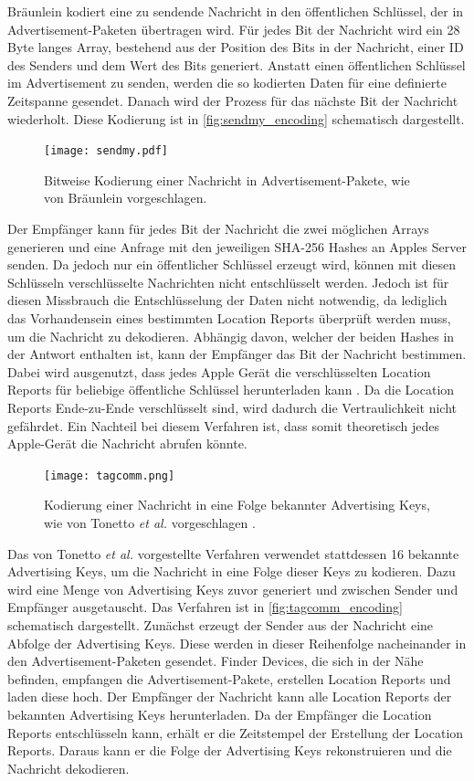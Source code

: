 Bräunlein \cite{braeunlein_sendmy} kodiert eine zu sendende Nachricht in den öffentlichen Schlüssel, der in Advertisement-Paketen übertragen wird.
Für jedes Bit der Nachricht wird ein 28 Byte langes Array, bestehend aus der Position des Bits in der Nachricht, einer ID des Senders und dem Wert des Bits generiert.
Anstatt einen öffentlichen Schlüssel im Advertisement zu senden, werden die so kodierten Daten für eine definierte Zeitspanne gesendet.
Danach wird der Prozess für das nächste Bit der Nachricht wiederholt.
Diese Kodierung ist in \autoref{fig:sendmy_encoding} schematisch dargestellt.
\begin{figure}[ht]
  \centering
  \texttt{[image: sendmy.pdf]}
  \caption{Bitweise Kodierung einer Nachricht in Advertisement-Pakete, wie von Bräunlein vorgeschlagen.}
  \label{fig:sendmy_encoding}
\end{figure}
Der Empfänger kann für jedes Bit der Nachricht die zwei möglichen Arrays generieren und eine Anfrage mit den jeweiligen \ac{SHA}-256 Hashes an Apples Server senden.
Da jedoch nur ein öffentlicher Schlüssel erzeugt wird, können mit diesen Schlüsseln verschlüsselte Nachrichten nicht entschlüsselt werden.
Jedoch ist für diesen Missbrauch die Entschlüsselung der Daten nicht notwendig, da lediglich das Vorhandensein eines bestimmten Location Reports überprüft werden muss, um die Nachricht zu dekodieren.
Abhängig davon, welcher der beiden Hashes in der Antwort enthalten ist, kann der Empfänger das Bit der Nachricht bestimmen.
Dabei wird ausgenutzt, dass jedes Apple Gerät die verschlüsselten Location Reports für beliebige öffentliche Schlüssel herunterladen kann \cite{Heinrich_OpenHaystack,braeunlein_sendmy}.
Da die Location Reports Ende-zu-Ende verschlüsselt sind, wird dadurch die Vertraulichkeit nicht gefährdet.
Ein Nachteil bei diesem Verfahren ist, dass somit theoretisch jedes Apple-Gerät die Nachricht abrufen könnte.

\begin{figure}[ht]
  \centering
  \texttt{[image: tagcomm.png]}
  \caption{Kodierung einer Nachricht in eine Folge bekannter Advertising Keys, wie von Tonetto \textit{et al.} vorgeschlagen \cite{Tonetto_FindMy}.}
  \label{fig:tagcomm_encoding}
\end{figure}
Das von Tonetto \textit{et al.} \cite{Tonetto_FindMy} vorgestellte Verfahren verwendet stattdessen 16 bekannte Advertising Keys, um die Nachricht in eine Folge dieser Keys zu kodieren.
Dazu wird eine Menge von Advertising Keys zuvor generiert und zwischen Sender und Empfänger ausgetauscht.
Das Verfahren ist in \autoref{fig:tagcomm_encoding} schematisch dargestellt.
Zunächst erzeugt der Sender aus der Nachricht eine Abfolge der Advertising Keys.
Diese werden in dieser Reihenfolge nacheinander in den Advertisement-Paketen gesendet.
Finder Devices, die sich in der Nähe befinden, empfangen die Advertisement-Pakete, erstellen Location Reports und laden diese hoch.
Der Empfänger der Nachricht kann alle Location Reports der bekannten Advertising Keys herunterladen.
Da der Empfänger die Location Reports entschlüsseln kann, erhält er die Zeitstempel der Erstellung der Location Reports.
Daraus kann er die Folge der Advertising Keys rekonstruieren und die Nachricht dekodieren.

